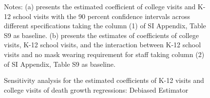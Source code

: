 \documentclass[9pt,twocolumn,twoside,lineno]{pnas-new}
\begin{document}
\begin{figure}[!ht]
  \caption{Sensitivity analysis for the estimated coefficients of K-12 visits and college visits of death growth regressions: Debiased Estimator \label{fig:sensitivity-death}}
\vspace{-0.2cm}   {\scriptsize
\begin{flushleft}
Notes:  (a) presents the estimated coefficient of college visits and K-12 school visits with the 90 percent confidence intervals across different specifications taking the column (1) of SI Appendix, Table S9 as baseline. (b) presents the estimates of coefficients of college visits, K-12 school visits, and the interaction between K-12 school visits and no mask wearing requirement for staff  taking column (2) of SI Appendix, Table S9  as baseline.
\end{flushleft}  }
\end{figure}
\end{document}
